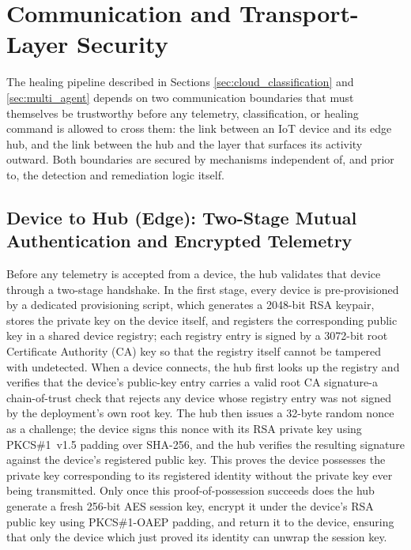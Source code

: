 \section{Communication and Transport-Layer Security}\label{sec:comm_security}

The healing pipeline described in Sections \ref{sec:cloud_classification} and \ref{sec:multi_agent} depends on two communication boundaries that must themselves be trustworthy before any telemetry, classification, or healing command is allowed to cross them: the link between an IoT device and its edge hub, and the link between the hub and the layer that surfaces its activity outward. Both boundaries are secured by mechanisms independent of, and prior to, the detection and remediation logic itself.

\subsection{Device to Hub (Edge): Two-Stage Mutual Authentication and Encrypted Telemetry}

Before any telemetry is accepted from a device, the hub validates that device through a two-stage handshake. In the first stage, every device is pre-provisioned by a dedicated provisioning script, which generates a 2048-bit RSA keypair, stores the private key on the device itself, and registers the corresponding public key in a shared device registry; each registry entry is signed by a 3072-bit root Certificate Authority (CA) key so that the registry itself cannot be tampered with undetected. When a device connects, the hub first looks up the registry and verifies that the device's public-key entry carries a valid root CA signature-a chain-of-trust check that rejects any device whose registry entry was not signed by the deployment's own root key. The hub then issues a 32-byte random nonce as a challenge; the device signs this nonce with its RSA private key using PKCS\#1~v1.5 padding over SHA-256, and the hub verifies the resulting signature against the device's registered public key. This proves the device possesses the private key corresponding to its registered identity without the private key ever being transmitted. Only once this proof-of-possession succeeds does the hub generate a fresh 256-bit AES session key, encrypt it under the device's RSA public key using PKCS\#1-OAEP padding, and return it to the device, ensuring that only the device which just proved its identity can unwrap the session key.

